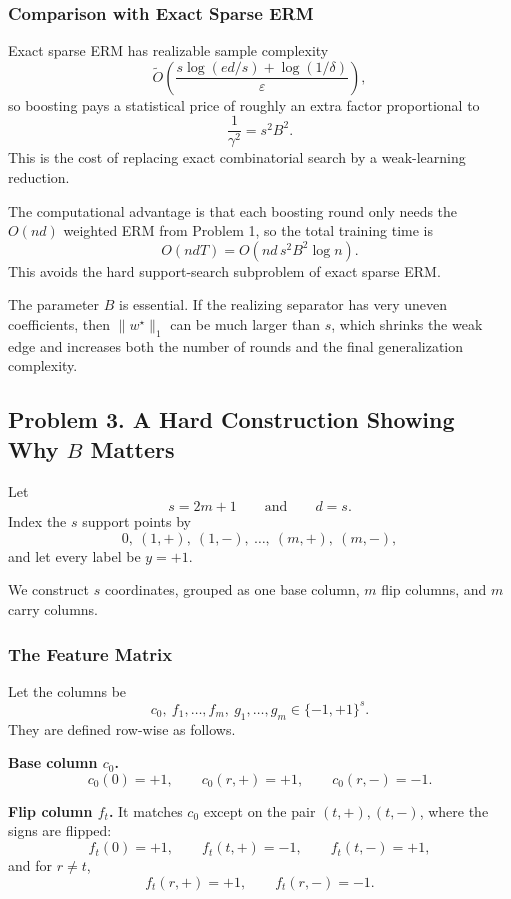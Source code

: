 \documentclass{article}
\begin{document}
\subsubsection{Comparison with Exact Sparse ERM}

Exact sparse ERM has realizable sample complexity
$$
\widetilde{O}\!\left(
\frac{
s\log(ed/s)+\log(1/\delta)
}{
\varepsilon
}
\right),
$$
so boosting pays a statistical price of roughly an extra factor proportional to
$$
\frac{1}{\gamma^2} = s^2B^2.
$$
This is the cost of replacing exact combinatorial search by a weak-learning reduction.

The computational advantage is that each boosting round only needs the $O(nd)$ weighted ERM from Problem 1, so the total training time is
$$
O(ndT)=O(nd\,s^2B^2\log n).
$$
This avoids the hard support-search subproblem of exact sparse ERM.

The parameter $B$ is essential. If the realizing separator has very uneven coefficients, then $\|w^\star\|_1$ can be much larger than $s$, which shrinks the weak edge and increases both the number of rounds and the final generalization complexity.

\subsection{\texorpdfstring{Problem 3. A Hard Construction Showing Why $B$ Matters}{Problem 3. A Hard Construction Showing Why B Matters}}

Let
$$
s=2m+1
\qquad\text{and}\qquad
d=s.
$$
Index the $s$ support points by
$$
0,\ (1,+),\ (1,-),\ \dots,\ (m,+),\ (m,-),
$$
and let every label be $y=+1$.

We construct $s$ coordinates, grouped as one base column, $m$ flip columns, and $m$ carry columns.

\subsubsection{The Feature Matrix}

Let the columns be
$$
c_0,\ f_1,\dots,f_m,\ g_1,\dots,g_m \in \{-1,+1\}^s.
$$
They are defined row-wise as follows.

\textbf{Base column $c_0$.}
$$
c_0(0)=+1,
\qquad
c_0(r,+)=+1,
\qquad
c_0(r,-)=-1.
$$

\textbf{Flip column $f_t$.}
It matches $c_0$ except on the pair $(t,+),(t,-)$, where the signs are flipped:
$$
f_t(0)=+1,
\qquad
f_t(t,+)=-1,
\qquad
f_t(t,-)=+1,
$$
and for $r\ne t$,
$$
f_t(r,+)=+1,
\qquad
f_t(r,-)=-1.
$$
\end{document}
